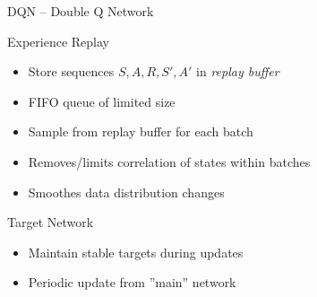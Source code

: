 \documentclass[ignorenonframetext,xcolor=x11names]{beamer}
\begin{document}
\begin{frame}{DQN -- Double Q Network}
\begin{block}{Experience Replay}
\begin{itemize}
  \item Store sequences $S, A, R, S', A'$ in \emph{replay buffer}
  \item FIFO queue of limited size
  \item Sample from replay buffer for each batch
  \item Removes/limits correlation of states within batches
  \item Smoothes data distribution changes
\end{itemize}
\end{block}
\begin{block}{Target Network}
\begin{itemize}
   \item Maintain stable targets during updates
   \item Periodic update from ''main'' network
\end{itemize}
\end{block}
\end{frame}
\end{document}
